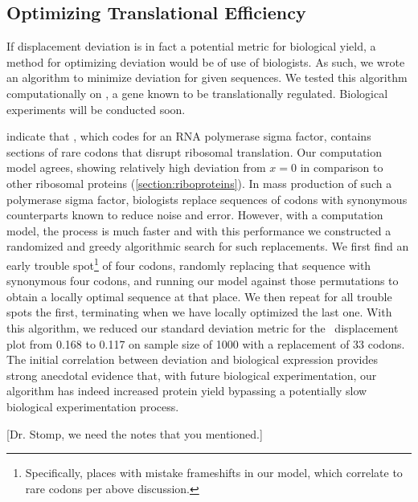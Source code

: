 \documentclass[12pt]{article}
\numberwithin{equation}{section}
\begin{document}
\subsection{Optimizing Translational Efficiency}

If displacement deviation is in fact a potential metric for biological yield,
a method for optimizing deviation would be of use of biologists.  As such,
we wrote an algorithm to minimize deviation for given sequences.
We tested this algorithm computationally on \rpoS, a gene known to
be translationally regulated.  Biological experiments will be
conducted soon.


\citet{rpoS:process} indicate that \rpoS, which codes for an RNA
polymerase sigma factor, contains sections of rare codons that disrupt
ribosomal translation. Our computation model agrees, showing
relatively high deviation from $x = 0$ in comparison to other
ribosomal proteins (\autoref{section:riboproteins}). In mass
production of such a polymerase sigma factor, biologists replace
sequences of codons with synonymous counterparts known to reduce noise
and error. However, with a computation model, the process is much
faster and with this performance we constructed a randomized and greedy
algorithmic search for such replacements. We first find an
early trouble spot\footnote{Specifically, places with mistake
  frameshifts in our model, which correlate to rare codons per above
  discussion.} of four codons, randomly replacing that sequence with
synonymous four codons, and running our model against those
permutations to obtain a locally optimal sequence at that place. We
then repeat for all trouble spots the first, terminating when we have
locally optimized the last one. With this algorithm, we reduced our
standard deviation metric for the \rpoS\ displacement plot from 0.168
to 0.117 on sample size of 1000 with a replacement of 33 codons. The
initial correlation between deviation and biological expression
provides strong anecdotal evidence that, with future biological
experimentation, our algorithm has indeed increased protein yield
bypassing a potentially slow biological experimentation process.

[Dr. Stomp, we need the notes that you mentioned.]
\end{document}
